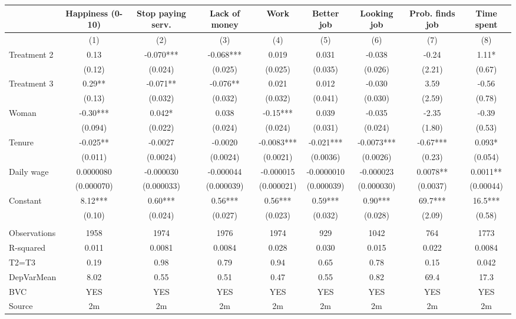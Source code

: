 \begin{tabular}{lcccccccc}
\toprule
      & Happiness (0-10) & Stop paying serv. & Lack of money & Work  & Better job & Looking job & Prob. finds job & Time spent \\
\midrule
\midrule
      & (1)   & (2)   & (3)   & (4)   & (5)   & (6)   & (7)   & (8) \\
\midrule
\midrule
Treatment 2 & 0.13  & -0.070*** & -0.068*** & 0.019 & 0.031 & -0.038 & -0.24 & 1.11* \\
      & (0.12) & (0.024) & (0.025) & (0.025) & (0.035) & (0.026) & (2.21) & (0.67) \\
Treatment 3 & 0.29** & -0.071** & -0.076** & 0.021 & 0.012 & -0.030 & 3.59  & -0.56 \\
      & (0.13) & (0.032) & (0.032) & (0.032) & (0.041) & (0.030) & (2.59) & (0.78) \\
Woman & -0.30*** & 0.042* & 0.038 & -0.15*** & 0.039 & -0.035 & -2.35 & -0.39 \\
      & (0.094) & (0.022) & (0.024) & (0.024) & (0.031) & (0.024) & (1.80) & (0.53) \\
Tenure & -0.025** & -0.0027 & -0.0020 & -0.0083*** & -0.021*** & -0.0073*** & -0.67*** & 0.093* \\
      & (0.011) & (0.0024) & (0.0024) & (0.0021) & (0.0036) & (0.0026) & (0.23) & (0.054) \\
Daily wage & 0.0000080 & -0.000030 & -0.000044 & -0.000015 & -0.0000010 & -0.000023 & 0.0078** & 0.0011** \\
      & (0.000070) & (0.000033) & (0.000039) & (0.000021) & (0.000039) & (0.000030) & (0.0037) & (0.00044) \\
Constant & 8.12*** & 0.60*** & 0.56*** & 0.56*** & 0.59*** & 0.90*** & 69.7*** & 16.5*** \\
      & (0.10) & (0.024) & (0.027) & (0.023) & (0.032) & (0.028) & (2.09) & (0.58) \\
      &       &       &       &       &       &       &       &  \\
\midrule
Observations & 1958  & 1974  & 1976  & 1974  & 929   & 1042  & 764   & 1773 \\
R-squared & 0.011 & 0.0081 & 0.0084 & 0.028 & 0.030 & 0.015 & 0.022 & 0.0084 \\
T2=T3 & 0.19  & 0.98  & 0.79  & 0.94  & 0.65  & 0.78  & 0.15  & 0.042 \\
DepVarMean & 8.02  & 0.55  & 0.51  & 0.47  & 0.55  & 0.82  & 69.4  & 17.3 \\
BVC   & YES   & YES   & YES   & YES   & YES   & YES   & YES   & YES \\
Source & 2m    & 2m    & 2m    & 2m    & 2m    & 2m    & 2m    & 2m \\
\bottomrule
\bottomrule
\end{tabular}%
